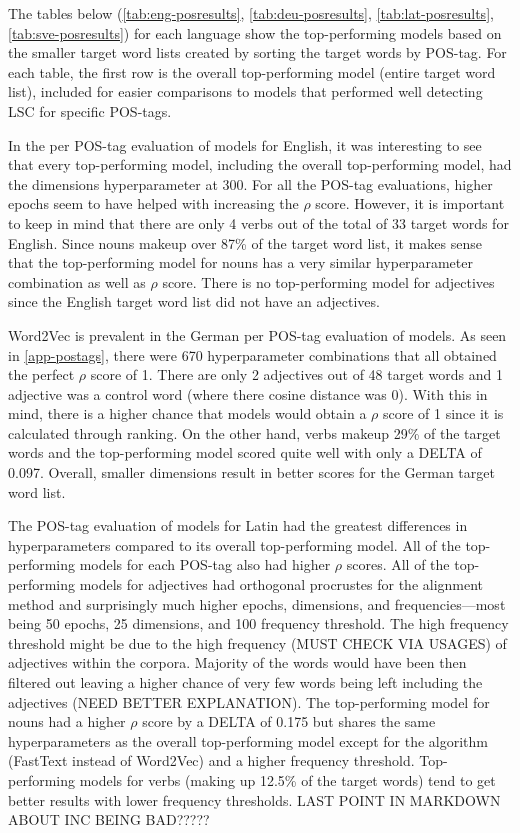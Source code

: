 The tables below (\autoref{tab:eng-posresults}, \autoref{tab:deu-posresults}, \autoref{tab:lat-posresults}, \autoref{tab:sve-posresults}) for each language show the top-performing models based on the smaller target word lists created by sorting the target words by POS-tag. For each table, the first row is the overall top-performing model (entire target word list), included for easier comparisons to models that performed well detecting LSC for specific POS-tags. 

In the per POS-tag evaluation of models for English, it was interesting to see that every top-performing model, including the overall top-performing model, had the dimensions hyperparameter at 300. For all the POS-tag evaluations, higher epochs seem to have helped with increasing the $\rho$ score. However, it is important to keep in mind that there are only 4 verbs out of the total of 33 target words for English. Since nouns makeup over 87\% of the target word list, it makes sense that the top-performing model for nouns has a very similar hyperparameter combination as well as $\rho$ score. There is no top-performing model for adjectives since the English target word list did not have an adjectives. 


Word2Vec is prevalent in the German per POS-tag evaluation of models. As seen in \autoref{app-postags}, there were 670 hyperparameter combinations that all obtained the perfect $\rho$ score of 1. There are only 2 adjectives out of 48 target words and 1 adjective was a control word (where there cosine distance was 0). With this in mind, there is a higher chance that models would obtain a $\rho$ score of 1 since it is calculated through ranking. On the other hand, verbs makeup 29\% of the target words and the top-performing model scored quite well with only a DELTA of 0.097. Overall, smaller dimensions result in better scores for the German target word list. 


The POS-tag evaluation of models for Latin had the greatest differences in hyperparameters compared to its overall top-performing model. All of the top-performing models for each POS-tag also had higher $\rho$ scores. All of the top-performing models for adjectives had orthogonal procrustes for the alignment method and surprisingly much higher epochs, dimensions, and frequencies—most being 50 epochs, 25 dimensions, and 100 frequency threshold. The high frequency threshold might be due to the high frequency (MUST CHECK VIA USAGES) of adjectives within the corpora. Majority of the words would have been then filtered out leaving a higher chance of very few words being left including the adjectives (NEED BETTER EXPLANATION). The top-performing model for nouns had a higher $\rho$ score by a DELTA of 0.175 but shares the same hyperparameters as the overall top-performing model except for the algorithm (FastText instead of Word2Vec) and a higher frequency threshold. Top-performing models for verbs (making up 12.5\% of the target words) tend to get better results with lower frequency thresholds. LAST POINT IN MARKDOWN ABOUT INC BEING BAD?????


